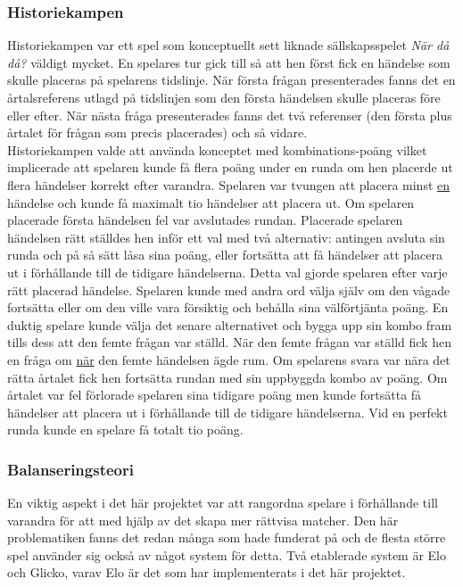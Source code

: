 \documentclass[a4paper, 11pt]{article}
\begin{document}
\subsubsection{Historiekampen}
Historiekampen var ett spel som konceptuellt sett liknade sällskapsspelet \textit{När då då?} väldigt mycket. En spelares tur gick till så att hen först fick en händelse som skulle placeras på spelarens tidslinje. När första frågan presenterades fanns det en årtalsreferens utlagd på tidslinjen som den första händelsen skulle placeras före eller efter. När nästa fråga presenterades fanns det två referenser (den första plus årtalet för frågan som precis placerades) och så vidare.\\ 
Historiekampen valde att använda konceptet med kombinations-poäng vilket implicerade att spelaren kunde få flera poäng under en runda om hen placerde ut flera händelser korrekt efter varandra. Spelaren var tvungen att placera minst \underline{en} händelse och kunde få maximalt tio händelser att placera ut. Om spelaren placerade första händelsen fel var avslutades rundan. Placerade spelaren händelsen rätt ställdes hen inför ett val med två alternativ: antingen avsluta sin runda och på så sätt låsa sina poäng, eller fortsätta att få händelser att placera ut i förhållande till de tidigare händelserna. Detta val gjorde spelaren efter varje rätt placerad händelse. Spelaren kunde med andra ord välja själv om den vågade fortsätta eller om den ville vara försiktig och behålla sina välförtjänta poäng. En duktig spelare kunde välja det senare alternativet och bygga upp sin kombo fram tills dess att den femte frågan var ställd. När den femte frågan var ställd fick hen en fråga om \underline{när} den femte händelsen ägde rum. Om spelarens svara var nära det rätta årtalet fick hen fortsätta rundan med sin uppbyggda kombo av poäng. Om årtalet var fel förlorade spelaren sina tidigare poäng men kunde fortsätta få händelser att placera ut i förhållande till de tidigare händelserna. Vid en perfekt runda kunde en spelare få totalt tio poäng.

\subsubsection{Balanseringsteori}
En viktig aspekt i det här projektet var att rangordna spelare i förhållande till varandra för att med hjälp av det skapa mer rättvisa matcher. Den här problematiken fanns det redan många som hade funderat på och de flesta större spel använder sig också av något system för detta. Två etablerade system är Elo och Glicko, varav Elo är det som har implementerats i det här projektet.
\end{document}
